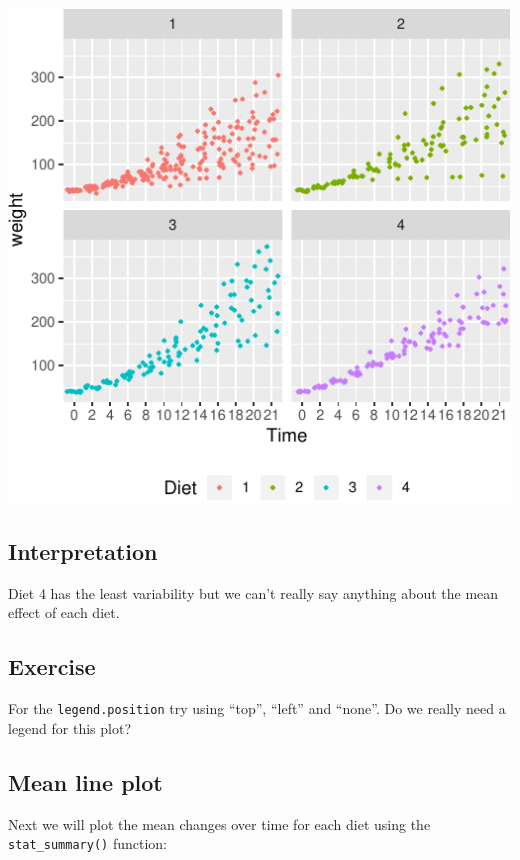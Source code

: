\documentclass[a4paper,9pt,twocolumn,twoside,printwatermark=false]{pinp}
\begin{document}
\begin{center}\includegraphics{Getting-Started-in-R_files/figure-latex/jitterPlot-1} \end{center}

\subsection{Interpretation}\label{interpretation-2}

Diet 4 has the least variability but we can't really say anything about
the mean effect of each diet.

\subsection{Exercise}\label{exercise-4}

For the \texttt{legend.position} try using ``top'', ``left'' and
``none''. Do we really need a legend for this plot?

\subsection{Mean line plot}\label{mean-line-plot}

Next we will plot the mean changes over time for each diet using the
\texttt{stat\_summary()} function:
\end{document}
